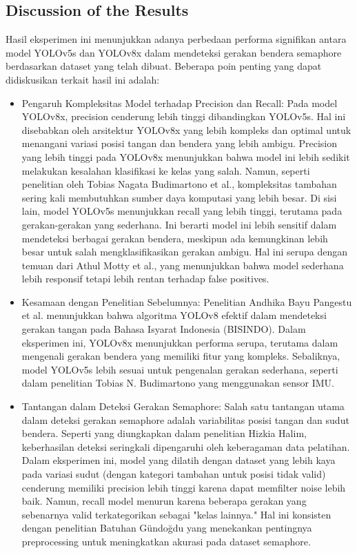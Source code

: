 \documentclass[12pt,a4paper]{article}
\begin{document}
\subsection{Discussion of the Results}
\begin{adjustwidth}{3em}{0pt}
\hspace{0.5cm} Hasil eksperimen ini menunjukkan adanya perbedaan performa signifikan antara model YOLOv5s dan YOLOv8x dalam mendeteksi gerakan bendera semaphore berdasarkan dataset yang telah dibuat. Beberapa poin penting yang dapat didiskusikan terkait hasil ini adalah:
\begin{itemize}
    \item Pengaruh Kompleksitas Model terhadap Precision dan Recall: Pada model YOLOv8x, precision cenderung lebih tinggi dibandingkan YOLOv5s. Hal ini disebabkan oleh arsitektur YOLOv8x yang lebih kompleks dan optimal untuk menangani variasi posisi tangan dan bendera yang lebih ambigu. Precision yang lebih tinggi pada YOLOv8x menunjukkan bahwa model ini lebih sedikit melakukan kesalahan klasifikasi ke kelas yang salah. Namun, seperti penelitian oleh Tobias Nagata Budimartono et al., kompleksitas tambahan sering kali membutuhkan sumber daya komputasi yang lebih besar. Di sisi lain, model YOLOv5s menunjukkan recall yang lebih tinggi, terutama pada gerakan-gerakan yang sederhana. Ini berarti model ini lebih sensitif dalam mendeteksi berbagai gerakan bendera, meskipun ada kemungkinan lebih besar untuk salah mengklasifikasikan gerakan ambigu. Hal ini serupa dengan temuan dari Athul Motty et al., yang menunjukkan bahwa model sederhana lebih responsif tetapi lebih rentan terhadap false positives.

    \item Kesamaan dengan Penelitian Sebelumnya: Penelitian Andhika Bayu Pangestu et al. menunjukkan bahwa algoritma YOLOv8 efektif dalam mendeteksi gerakan tangan pada Bahasa Isyarat Indonesia (BISINDO). Dalam eksperimen ini, YOLOv8x menunjukkan performa serupa, terutama dalam mengenali gerakan bendera yang memiliki fitur yang kompleks. Sebaliknya, model YOLOv5s lebih sesuai untuk pengenalan gerakan sederhana, seperti dalam penelitian Tobias N. Budimartono yang menggunakan sensor IMU.

    \item Tantangan dalam Deteksi Gerakan Semaphore: Salah satu tantangan utama dalam deteksi gerakan semaphore adalah variabilitas posisi tangan dan sudut bendera. Seperti yang diungkapkan dalam penelitian Hizkia Halim, keberhasilan deteksi seringkali dipengaruhi oleh keberagaman data pelatihan. Dalam eksperimen ini, model yang dilatih dengan dataset yang lebih kaya pada variasi sudut (dengan kategori tambahan untuk posisi tidak valid) cenderung memiliki precision lebih tinggi karena dapat memfilter noise lebih baik. Namun, recall model menurun karena beberapa gerakan yang sebenarnya valid terkategorikan sebagai "kelas lainnya." Hal ini konsisten dengan penelitian Batuhan Gündoğdu yang menekankan pentingnya preprocessing untuk meningkatkan akurasi pada dataset semaphore.


\end{itemize}
\end{adjustwidth}
\end{document}

